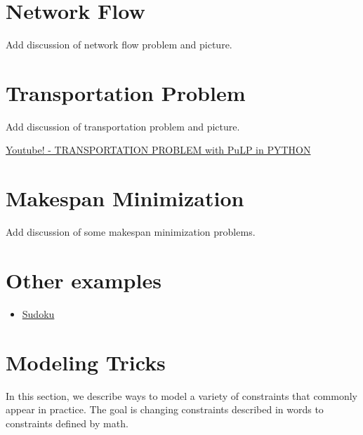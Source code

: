 \documentclass[../open-optimization/open-optimization.tex]{subfiles}
\begin{document}





\section{Network Flow}
\begin{todo}
Add discussion of network flow problem and picture.
\end{todo}

\section{Transportation Problem}
\begin{todo}
Add discussion of transportation problem and picture.
\end{todo}

\href{https://www.youtube.com/watch?v=Jr7LI-sUEmo}{Youtube! - TRANSPORTATION PROBLEM with PuLP in PYTHON}

\section{Makespan Minimization}
\begin{todo}
 Add discussion of some makespan minimization problems.
 \end{todo}

\section{Other examples}
\begin{itemize}
\item \href{https://www.juliaopt.org/notebooks/JuMP-Sudoku.html}{Sudoku}
\end{itemize}
\section{Modeling Tricks}
In this section, we describe ways to model a variety of constraints that commonly appear in practice.  The goal is changing constraints described in words to constraints defined by math.
\end{document}
